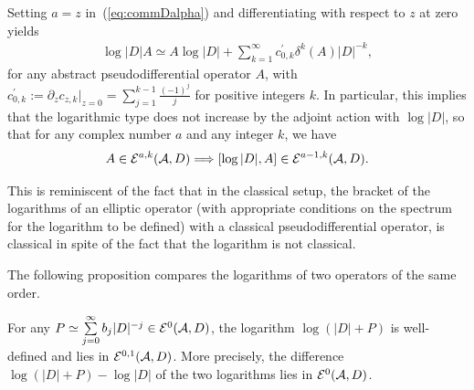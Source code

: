  Setting $a=z$ in~(\ref{eq:commDalpha}) and dif\/ferentiating with respect to $z$
 at zero yields
\begin{gather*}  \log \vert D\vert   A\simeq A   \log \vert D\vert +
 \sum_{k=1}^\infty c^\prime_{0,k}
\delta^k(A)   \vert D\vert^{-k},
\end{gather*}
for any abstract pseudodif\/ferential operator $A$,
with
$c^\prime_{0, k}:=\partial_z c_{ z, k}\vert_{z=0}=
\sum\limits_{j=1}^{k-1}\frac{(-1)^j}{j}$ for positive integers $k$. In particular,
this implies that the logarithmic type does not increase
 by the adjoint action with $ \log \vert D\vert$,
 so that for any complex number $a$ and any integer $k$,  we have
\begin{gather}\label{eq:commDalphalog}
A\in {\cal E}^{a,k}({\cal A}, D)\Longrightarrow [ \log \vert D\vert,    A ]
\in {\cal E}^{a-1,k}({\cal A}, D).
\end{gather}
\begin{remark}
  This  is reminiscent of   the  fact that in the classical setup,
  the  bracket of the logarithms of an elliptic operator
   (with appropriate conditions on the spectrum for the logarithm to
    be def\/ined) with a classical pseudodif\/ferential operator, is
    classical in spite of the fact that the   logarithm is not classical.
    \end{remark}

     The following proposition compares  the logarithms
   of two operators of the  same order.
\begin{proposition}\label{prop:differencelog}
For any $P\simeq \sum\limits_{j=0}^\infty b_j   \vert D\vert^{-j}
\in {\cal E}^0({\cal A}, D)$, the logarithm $\log
  (\vert D\vert+P)$ is well-defined and  lies in
${\cal E}^{0,1}({\cal A}, D)$. More precisely, the difference
 $\log   (\vert D\vert+P) -\log  \vert D\vert $ of the
  two logarithms lies  in ${\cal E}^0({\cal A}, D)$.
\end{proposition}

